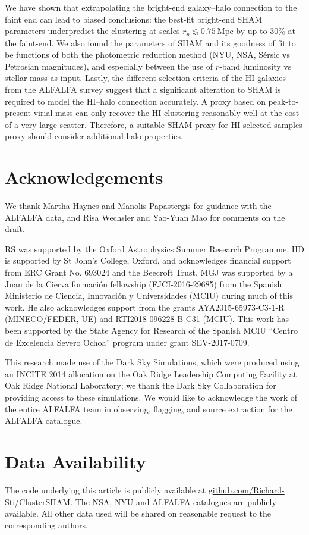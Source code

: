 \documentclass[usenatbib,useAMS]{mnras}
\newcommand{\HI}{\ensuremath{\mathrm{H}\scriptstyle\mathrm{I}}}
\begin{document}
We have shown that extrapolating the bright-end galaxy--halo connection to the faint end can lead to biased conclusions: the best-fit bright-end \ac{SHAM} parameters underpredict the clustering at scales $r_p\lesssim 0.75~\mathrm{Mpc}$ by up to $30\%$ at the faint-end. We also found the parameters of \ac{SHAM} and its goodness of fit to be functions of both the photometric reduction method (\ac{NYU}, \ac{NSA}, S\'{e}rsic vs Petrosian magnitudes), and especially between the use of $r$-band luminosity vs stellar mass as input. Lastly, the different selection criteria of the $\HI$ galaxies from the ALFALFA survey suggest that a significant alteration to \ac{SHAM} is required to model the $\HI$--halo connection accurately. A proxy based on peak-to-present virial mass can only recover the $\HI$ clustering reasonably well at the cost of a very large scatter. Therefore, a suitable \ac{SHAM} proxy for $\HI$-selected samples proxy should consider additional halo properties.


\section*{Acknowledgements}
We thank Martha Haynes and Manolis Papastergis for guidance with the ALFALFA data, and Risa Wechsler and Yao-Yuan Mao for comments on the draft.

RS was supported by the Oxford Astrophysics Summer Research Programme. HD is supported by St John's College, Oxford, and acknowledges financial support from ERC Grant No. 693024 and the Beecroft Trust. MGJ was supported by a Juan de la Cierva formaci\'{o}n fellowship (FJCI-2016-29685) from the Spanish Ministerio de Ciencia, Innovaci\'{o}n y Universidades (MCIU) during much of this work. He also acknowledges support from the grants AYA2015-65973-C3-1-R (MINECO/FEDER, UE) and RTI2018-096228-B-C31 (MCIU). This work has been supported by the State Agency for Research of the Spanish MCIU ``Centro de Excelencia Severo Ochoa'' program under grant SEV-2017-0709.

This research made use of the Dark Sky Simulations, which were produced using an INCITE 2014 allocation on the Oak Ridge Leadership Computing Facility at Oak Ridge National Laboratory; we thank the Dark Sky Collaboration for providing access to these simulations. We would like to acknowledge the work of the entire ALFALFA team in observing, flagging, and source extraction for the ALFALFA catalogue.

\section*{Data Availability}
The code underlying this article is publicly available at \href{https://github.com/Richard-Sti/ClusterSHAM}{github.com/Richard-Sti/ClusterSHAM}. The NSA, \ac{NYU} and ALFALFA catalogues are publicly available. All other data used will be shared on reasonable request to the corresponding authors.






\label{lastpage}
\end{document}
